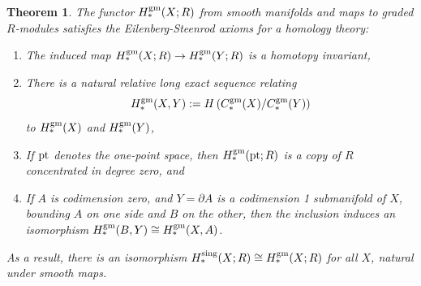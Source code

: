 \documentclass{memo-l}
\newtheorem{theorem}{Theorem}[chapter]
\theoremstyle{definition}
\theoremstyle{remark}
\numberwithin{section}{chapter}
\numberwithin{equation}{chapter}
\begin{document}
\begin{theorem}\label{eilenberg}The functor $H_*^{\textup{gm}}(X;R)$ from smooth manifolds and maps to graded $R$-modules satisfies the Eilenberg-Steenrod axioms for a homology theory: \begin{enumerate}
    \item The induced map $H_*^{\textup{gm}}(X;R) \to H_*^{\textup{gm}}(Y;R)$ is a homotopy invariant, 
    \item There is a natural relative long exact sequence relating 
    $$H_*^{\textup{gm}}(X,Y) := H\left(C_*^{\textup{gm}}(X)/C_*^{\textup{gm}}(Y)\right)$$ 
    to $H_*^{\textup{gm}}(X)$ and $H_*^{\textup{gm}}(Y)$, 
    \item If $\textup{pt}$ denotes the one-point space, then $H_*^{\textup{gm}}(\textup{pt};R)$ is a copy of $R$ concentrated in degree zero, and
    \item If $A$ is codimension zero, and $Y = \partial A$ is a codimension 1 submanifold of $X$, bounding $A$ on one side and $B$ on the other, then the inclusion induces an isomorphism $H_*^{\textup{gm}}(B, Y) \cong H_*^{\textup{gm}}(X, A)$.
\end{enumerate}
As a result, there is an isomorphism $H_*^{\textup{sing}}(X;R) \cong H_*^{\textup{gm}}(X;R)$ for all $X$, natural under smooth maps.
\end{theorem}
\end{document}
